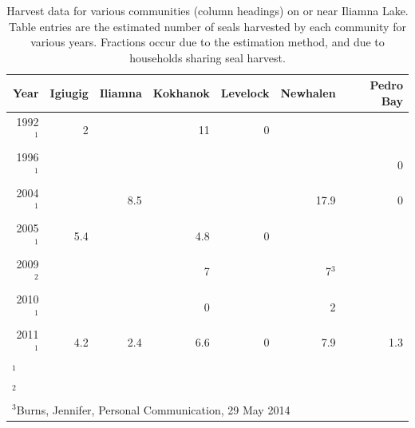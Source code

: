 \documentclass[12pt, titlepage]{article}\usepackage[]{graphicx}\usepackage[]{color}
\begin{document}
\begin{table}[ht] 
\caption{Harvest data for various communities (column headings) on or near Iliamna Lake. Table entries are the estimated number of seals harvested by each community for various years.  Fractions occur due to the estimation method, and due to households sharing seal harvest. \label{tab:harvest}}
\centering
\begin{tabular}{rrrrrrr}
  \hline
  \hline
  Year & Igiugig & Iliamna & Kokhanok & Levelock & Newhalen & Pedro Bay \\ 
  \hline
  \hline
  1992$^1$ & 2   &     &  11 & 0 &      & \\ 
  1996$^1$ &     &     &     &   &      & 0 \\  
  2004$^1$ &     & 8.5 &     &   & 17.9 & 0 \\  
  2005$^1$ & 5.4 &     & 4.8 & 0 &      & \\  
  2009$^2$ &     &     &   7 &   &    7$^3$ & \\ 
  2010$^1$ &     &     &   0 &   &    2 & \\  
  2011$^1$ & 4.2 & 2.4 & 6.6 & 0 &  7.9 & 1.3 \\  
  \hline
  \multicolumn{7}{l}{$^1$\citet{Burn:Van:With:Hole:Asko:inte:2016}} \\
  \multicolumn{7}{l}{$^2$\citet{Burn:Chyt:Gome:Asko:inte:2011}} \\
  \multicolumn{7}{l}{$^3$Burns, Jennifer, Personal Communication, 29 May 2014}
\end{tabular}
\end{table}
\end{document}
